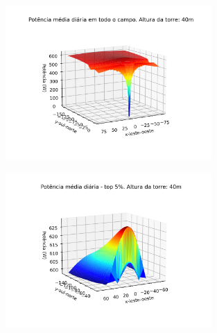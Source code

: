 \documentclass[12pt,notheorems,hyperref={pdfauthor=Professor Rafael Nardi}]{beamer}
\begin{document}
\begin{frame}%
	\begin{figure}[htpb]
		\centering
		\includegraphics[width=0.7\textwidth]{../../plots/tower_shadow_correction/square_grid_along_day_40mfull_grid.png}
		\label{fig:heliost_field_average_40m}
	\end{figure}
\end{frame}

\begin{frame}%
	\begin{figure}[htpb]
		\centering
		\includegraphics[width=0.7\textwidth]{../../plots/tower_shadow_correction/square_grid_along_day_40mtop_5_most_powerfull.png}
		\label{fig:heliost_field_average_40m_top5}
	\end{figure}
\end{frame}
\end{document}
